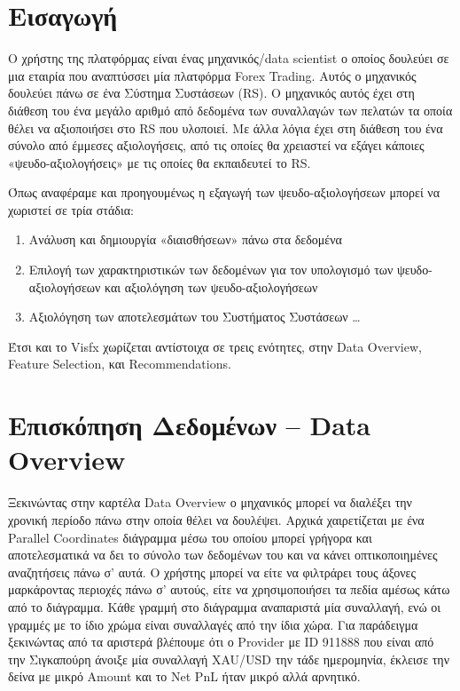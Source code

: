 


\section{Εισαγωγή}

Ο χρήστης της πλατφόρμας είναι ένας μηχανικός/data scientist ο οποίος δουλεύει σε μια εταιρία που αναπτύσσει μία πλατφόρμα Forex Trading. Αυτός ο μηχανικός δουλεύει πάνω σε ένα Σύστημα Συστάσεων (RS). Ο μηχανικός αυτός έχει στη διάθεση του ένα μεγάλο αριθμό από δεδομένα των συναλλαγών των πελατών τα οποία θέλει να αξιοποιήσει στο RS που υλοποιεί. Με άλλα λόγια έχει στη διάθεση του ένα σύνολο από έμμεσες αξιολογήσεις, από τις οποίες θα χρειαστεί να εξάγει κάποιες «ψευδο-αξιολογήσεις» με τις οποίες θα εκπαιδευτεί το RS.

Όπως αναφέραμε και προηγουμένως η εξαγωγή των ψευδο-αξιολογήσεων μπορεί να χωριστεί σε τρία στάδια:

\begin{enumerate}
	\item Ανάλυση και δημιουργία «διαισθήσεων» πάνω στα δεδομένα
	\item Επιλογή των χαρακτηριστικών των δεδομένων για τον υπολογισμό των ψευδο-αξιολογήσεων και αξιολόγηση των ψευδο-αξιολογήσεων
	\item Αξιολόγηση των αποτελεσμάτων του Συστήματος Συστάσεων \ldots
\end{enumerate} 	

Έτσι και το Visfx χωρίζεται αντίστοιχα σε τρεις ενότητες, στην Data Overview, Feature Selection, και Recommendations.

\section{Επισκόπηση Δεδομένων – Data Overview}

Ξεκινώντας στην καρτέλα Data Overview ο μηχανικός μπορεί να διαλέξει την χρονική περίοδο πάνω στην οποία θέλει να δουλέψει. Αρχικά χαιρετίζεται με ένα Parallel Coordinates διάγραμμα μέσω του οποίου μπορεί γρήγορα και αποτελεσματικά να δει το σύνολο των δεδομένων του και να κάνει οπτικοποιημένες αναζητήσεις πάνω σ’ αυτά. Ο χρήστης μπορεί να είτε να φιλτράρει τους άξονες μαρκάροντας περιοχές πάνω σ’ αυτούς, είτε να χρησιμοποιήσει τα πεδία αμέσως κάτω από το διάγραμμα. Κάθε γραμμή στο διάγραμμα αναπαριστά μία συναλλαγή, ενώ οι γραμμές με το ίδιο χρώμα είναι συναλλαγές από την ίδια χώρα. Για παράδειγμα ξεκινώντας από τα αριστερά βλέπουμε ότι ο Provider με ID 911888 που είναι από την Σιγκαπούρη άνοιξε μία συναλλαγή XAU/USD την τάδε ημερομηνία, έκλεισε την δείνα με μικρό Amount και το Net PnL ήταν μικρό αλλά αρνητικό.

